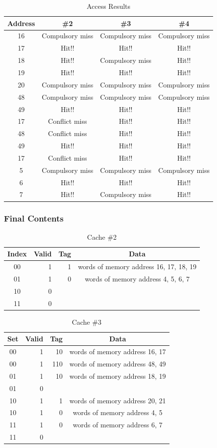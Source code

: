 \documentclass[12pt, a4paper]{article}
\begin{document}
\begin{table}[hbp]
\caption{Access Results}
\label{tab:cache_access}
\centering
\begin{tabular}{cccc}
Address & \#2 & \#3 & \#4 \\
\hline
16 & Compulsory miss & Compulsory miss & Compulsory miss \\
17 & Hit!! & Hit!! & Hit!! \\
18 & Hit!! & Compulsory miss & Hit!! \\
19 & Hit!! & Hit!! & Hit!! \\
20 & Compulsory miss & Compulsory miss & Compulsory miss \\
48 & Compulsory miss & Compulsory miss & Compulsory miss \\
49 & Hit!! & Hit!! & Hit!! \\
17 & Conflict miss & Hit!! & Hit!! \\
48 & Conflict miss & Hit!! & Hit!! \\
49 & Hit!! & Hit!! & Hit!! \\
17 & Conflict miss & Hit!! & Hit!! \\
5 & Compulsory miss & Compulsory miss & Compulsory miss \\
6 & Hit!! & Hit!! & Hit!! \\
7 & Hit!! & Compulsory miss & Hit!!
\end{tabular}
\end{table}

\subsubsection{Final Contents}

\begin{table}[hbp]
\caption{Cache \#2}
\label{tab:cache_content2}
\centering
\begin{tabular}{crrc}
Index & Valid & Tag & Data \\
\hline
00 & 1 & 1 & words of memory address 16, 17, 18, 19 \\
01 & 1 & 0 & words of memory address 4, 5, 6, 7 \\
10 & 0 \\
11 & 0
\end{tabular}
\end{table}

\begin{table}[hbp]
\caption{Cache \#3}
\label{tab:cache_content3}
\centering
\begin{tabular}{crrc}
Set & Valid & Tag & Data \\
\hline
00 & 1 & 10 & words of memory address 16, 17 \\
00 & 1 & 110 & words of memory address 48, 49 \\
01 & 1 & 10 & words of memory address 18, 19 \\
01 & 0 \\
10 & 1 & 1 & words of memory address 20, 21 \\
10 & 1 & 0 & words of memory address 4, 5 \\
11 & 1 & 0 & words of memory address 6, 7 \\
11 & 0
\end{tabular}
\end{table}
\end{document}
